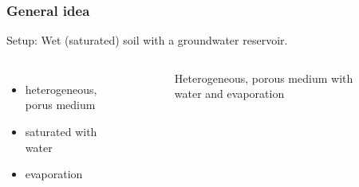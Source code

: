 \begin{frame}
	\frametitle{General idea}
	\vspace{1cm} %
	
	Setup: Wet (saturated) soil with a groundwater reservoir.
	\begin{columns}[t]
		\column{3cm}
		\begin{itemize}
     
		\item heterogeneous, porus medium
		\item saturated with water
		\item evaporation
     
    
		\end{itemize}
    
		\pause
    
		\column{7cm}
		\begin{figure}
		\centering
		\caption{Heterogeneous, porous medium with water and evaporation}
		
		\end{figure}
      \end{columns}
\end{frame}

